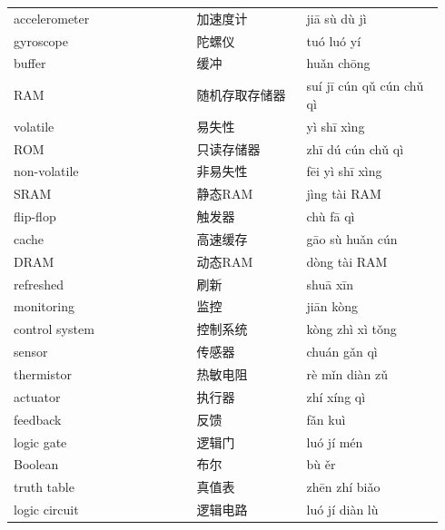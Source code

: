\documentclass[11pt]{article}
\begin{document}
\begin{longtable}{@{}p{0.40\linewidth}p{0.24\linewidth}p{0.30\linewidth}@{}}
accelerometer & 加速度计 & jiā sù dù jì \\
gyroscope & 陀螺仪 & tuó luó yí \\
buffer & 缓冲 & huǎn chōng \\
RAM & 随机存取存储器 & suí jī cún qǔ cún chǔ qì \\
volatile & 易失性 & yì shī xìng \\
ROM & 只读存储器 & zhī dú cún chǔ qì \\
non-volatile & 非易失性 & fēi yì shī xìng \\
SRAM & 静态RAM & jìng tài RAM \\
flip-flop & 触发器 & chù fā qì \\
cache & 高速缓存 & gāo sù huǎn cún \\
DRAM & 动态RAM & dòng tài RAM \\
refreshed & 刷新 & shuā xīn \\
monitoring & 监控 & jiān kòng \\
control system & 控制系统 & kòng zhì xì tǒng \\
sensor & 传感器 & chuán gǎn qì \\
thermistor & 热敏电阻 & rè mǐn diàn zǔ \\
actuator & 执行器 & zhí xíng qì \\
feedback & 反馈 & fǎn kuì \\
logic gate & 逻辑门 & luó jí mén \\
Boolean & 布尔 & bù ěr \\
truth table & 真值表 & zhēn zhí biǎo \\
logic circuit & 逻辑电路 & luó jí diàn lù \\
\end{longtable}
\end{document}
